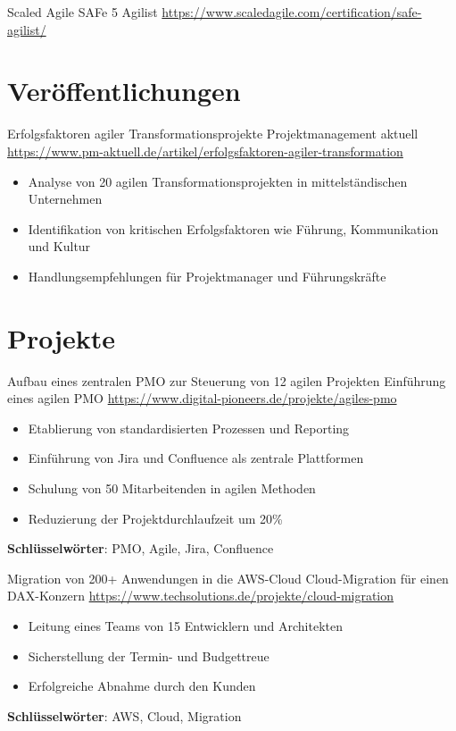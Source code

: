 \documentclass[a4paper, serif, 10pt]{moderncv}
\begin{document}
        {Scaled Agile}
        {SAFe 5 Agilist}
        {\url{https://www.scaledagile.com/certification/safe-agilist/}}
        {}
        {}
\section{Veröffentlichungen}

        {Erfolgsfaktoren agiler Transformationsprojekte}
        {Projektmanagement aktuell}
        {\url{https://www.pm-aktuell.de/artikel/erfolgsfaktoren-agiler-transformation}}
        {}
        {\begin{itemize}
\item Analyse von 20 agilen Transformationsprojekten in mittelständischen Unternehmen
\item Identifikation von kritischen Erfolgsfaktoren wie Führung, Kommunikation und Kultur
\item Handlungsempfehlungen für Projektmanager und Führungskräfte
\end{itemize}}
\section{Projekte}

        {Aufbau eines zentralen PMO zur Steuerung von 12 agilen Projekten}
        {Einführung eines agilen PMO}
        {\url{https://www.digital-pioneers.de/projekte/agiles-pmo}}
        {}
        {\begin{itemize}
\item Etablierung von standardisierten Prozessen und Reporting
\item Einführung von Jira und Confluence als zentrale Plattformen
\item Schulung von 50 Mitarbeitenden in agilen Methoden
\item Reduzierung der Projektdurchlaufzeit um 20\%
\end{itemize}
\textbf{Schlüsselwörter}: PMO, Agile, Jira, Confluence}

        {Migration von 200+ Anwendungen in die AWS-Cloud}
        {Cloud-Migration für einen DAX-Konzern}
        {\url{https://www.techsolutions.de/projekte/cloud-migration}}
        {}
        {\begin{itemize}
\item Leitung eines Teams von 15 Entwicklern und Architekten
\item Sicherstellung der Termin- und Budgettreue
\item Erfolgreiche Abnahme durch den Kunden
\end{itemize}
\textbf{Schlüsselwörter}: AWS, Cloud, Migration}
\end{document}

